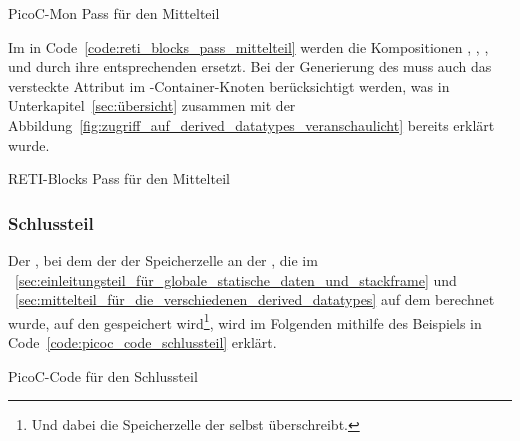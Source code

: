 \begin{code}
  \centering
  \caption{PicoC-Mon Pass für den Mittelteil}
  \label{code:picoc_mon_pass_mittelteil}
\end{code}

Im  in Code~\ref{code:reti_blocks_pass_mittelteil} werden die Kompositionen , , ,  und  durch ihre entsprechenden  ersetzt. Bei der Generierung des  muss auch das \textcolor{gray!90!black}{versteckte Attribut}  im -Container-Knoten berücksichtigt werden, was in Unterkapitel~\ref{sec:übersicht} zusammen mit der Abbildung~\ref{fig:zugriff_auf_derived_datatypes_veranschaulicht} bereits erklärt wurde.

\begin{code}
  \centering
  \caption{RETI-Blocks Pass für den Mittelteil}
  \label{code:reti_blocks_pass_mittelteil}
\end{code}

\subsubsection{Schlussteil}
\label{sec:schlussteil_für_die_verschiedenen_derived_datatypes}

Der , bei dem der  der Speicherzelle an der , die im ~\ref{sec:einleitungsteil_für_globale_statische_daten_und_stackframe} und ~\ref{sec:mittelteil_für_die_verschiedenen_derived_datatypes} auf dem  berechnet wurde, auf den  gespeichert wird\footnote{Und dabei die Speicherzelle der  selbst überschreibt.}, wird im Folgenden mithilfe des Beispiels in Code~\ref{code:picoc_code_schlussteil} erklärt.

\begin{code}
  \centering
  \caption{PicoC-Code für den Schlussteil}
  \label{code:picoc_code_schlussteil}
\end{code}

